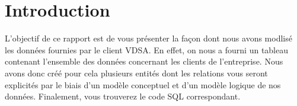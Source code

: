 \section{Introduction}

L'objectif de ce rapport est de vous présenter la façon dont nous avons modlisé les données fournies par le client VDSA. En effet, on nous a fourni un tableau contenant l'ensemble des données concernant les clients de l'entreprise. Nous avons donc créé pour cela plusieurs entités dont les relations vous seront explicités par le biais d'un modèle conceptuel et d'un modèle logique de nos données. Finalement, vous trouverez le code SQL correspondant. 
